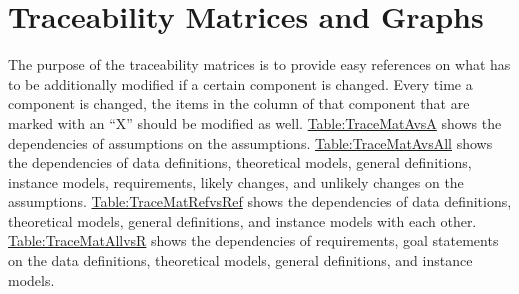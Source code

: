 \documentclass[12pt]{article}
\begin{document}
\section{Traceability Matrices and Graphs}
\label{Sec:TraceMatrices}
The purpose of the traceability matrices is to provide easy references on what has to be additionally modified if a certain component is changed. Every time a component is changed, the items in the column of that component that are marked with an ``X'' should be modified as well. \hyperref[Table:TraceMatAvsA]{Table:TraceMatAvsA} shows the dependencies of assumptions on the assumptions. \hyperref[Table:TraceMatAvsAll]{Table:TraceMatAvsAll} shows the dependencies of data definitions, theoretical models, general definitions, instance models, requirements, likely changes, and unlikely changes on the assumptions. \hyperref[Table:TraceMatRefvsRef]{Table:TraceMatRefvsRef} shows the dependencies of data definitions, theoretical models, general definitions, and instance models with each other. \hyperref[Table:TraceMatAllvsR]{Table:TraceMatAllvsR} shows the dependencies of requirements, goal statements on the data definitions, theoretical models, general definitions, and instance models.
\end{document}
